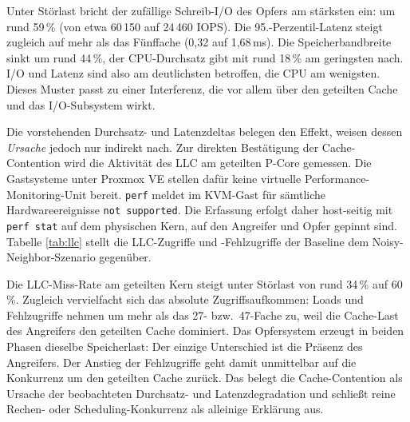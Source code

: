 \documentclass[conference]{IEEEtran}
\begin{document}
Unter Störlast bricht der zufällige Schreib-I/O des Opfers am stärksten ein: um rund 59\,\% (von etwa 60\,150 auf 24\,460 IOPS). Die 95.-Perzentil-Latenz steigt zugleich auf mehr als das Fünffache (0{,}32 auf 1{,}68\,ms). Die Speicherbandbreite sinkt um rund 44\,\%, der CPU-Durchsatz gibt mit rund 18\,\% am geringsten nach. I/O und Latenz sind also am deutlichsten betroffen, die CPU am wenigsten. Dieses Muster passt zu einer Interferenz, die vor allem über den geteilten Cache und das I/O-Subsystem wirkt.

Die vorstehenden Durchsatz- und Latenzdeltas belegen den Effekt, weisen dessen \emph{Ursache} jedoch nur indirekt nach. Zur direkten Bestätigung der Cache-Contention wird die Aktivität des LLC am geteilten P-Core gemessen. Die Gastsysteme unter Proxmox VE stellen dafür keine virtuelle Performance-Monitoring-Unit bereit. \texttt{perf} meldet im KVM-Gast für sämtliche Hardwareereignisse \texttt{not supported}. Die Erfassung erfolgt daher host-seitig mit \texttt{perf stat} auf dem physischen Kern, auf den Angreifer und Opfer gepinnt sind. Tabelle \ref{tab:llc} stellt die LLC-Zugriffe und -Fehlzugriffe der Baseline dem Noisy-Neighbor-Szenario gegenüber.

\begin{table}[htbp]
\caption{Kausalnachweis: LLC-Aktivität am geteilten P-Core, host-seitig über ein 10-Sekunden-Fenster gemessen, Baseline gegen Noisy Neighbor.}
\centering
{}
\label{tab:llc}
\end{table}

Die LLC-Miss-Rate am geteilten Kern steigt unter Störlast von rund 34\,\% auf 60\,\%. Zugleich vervielfacht sich das absolute Zugriffsaufkommen: Loads und Fehlzugriffe nehmen um mehr als das 27- bzw.\ 47-Fache zu, weil die Cache-Last des Angreifers den geteilten Cache dominiert. Das Opfersystem erzeugt in beiden Phasen dieselbe Speicherlast: Der einzige Unterschied ist die Präsenz des Angreifers. Der Anstieg der Fehlzugriffe geht damit unmittelbar auf die Konkurrenz um den geteilten Cache zurück. Das belegt die Cache-Contention als Ursache der beobachteten Durchsatz- und Latenzdegradation und schließt reine Rechen- oder Scheduling-Konkurrenz als alleinige Erklärung aus.
\end{document}
